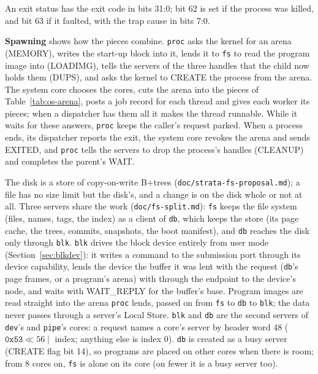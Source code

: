 

An exit status has the exit code in bits 31:0; bit 62 is set if the process was killed, and bit 63 if
it faulted, with the trap cause in bits 7:0.

\textbf{Spawning} shows how the pieces combine. \texttt{proc} asks the kernel for an arena (MEMORY),
writes the start-up block into it, lends it to \texttt{fs} to read the program image into (LOADIMG),
tells the servers of the three handles that the child now holds them (DUPS), and asks the kernel to
CREATE the process from the arena. The system core chooses the cores, cuts the arena into the pieces
of Table~\ref{tab:os-arena}, posts a job record for each thread and gives each worker its pieces; when
a dispatcher has them all it makes the thread runnable. While it waits for these answers, \texttt{proc}
keeps the caller's request parked. When a process ends, its dispatcher reports the exit, the system
core revokes the arena and sends EXITED, and \texttt{proc} tells the servers to drop the process's
handles (CLEANUP) and completes the parent's WAIT.





The disk is a store of copy-on-write B+trees (\texttt{doc/strata-fs-proposal.md}); a file has no
size limit but the disk's, and a change is on the disk whole or not at all. Three servers share the
work (\texttt{doc/fs-split.md}): \texttt{fs} keeps the file system (files, names, tags, the index) as a
client of \texttt{db}, which keeps the store (its page cache, the trees, commits, snapshots, the boot
manifest), and \texttt{db} reaches the disk only through \texttt{blk}. \texttt{blk} drives the block
device entirely from user mode (Section~\ref{sec:blkdev}): it writes a command to the submission port
through its device capability, lends the device the buffer it was lent with the request
(\texttt{db}'s page frames, or a program's arena) with  through the endpoint to the
device's node, and waits with WAIT\_REPLY for the buffer's base. Program images are read straight
into the arena \texttt{proc} lends, passed on from \texttt{fs} to \texttt{db} to \texttt{blk}; the data
never passes through a server's Local Store. \texttt{blk} and \texttt{db} are the second servers of
\texttt{dev}'s and \texttt{pipe}'s cores: a request names a core's server by header word 48
($\texttt{0x53} \ll 56 \mid$ index; anything else is index 0). \texttt{db} is
created as a busy server (CREATE flag bit 14), so programs are placed on other cores when there is room;
from 8 cores on, \texttt{fs} is alone on its core (on fewer it is a busy server too).

